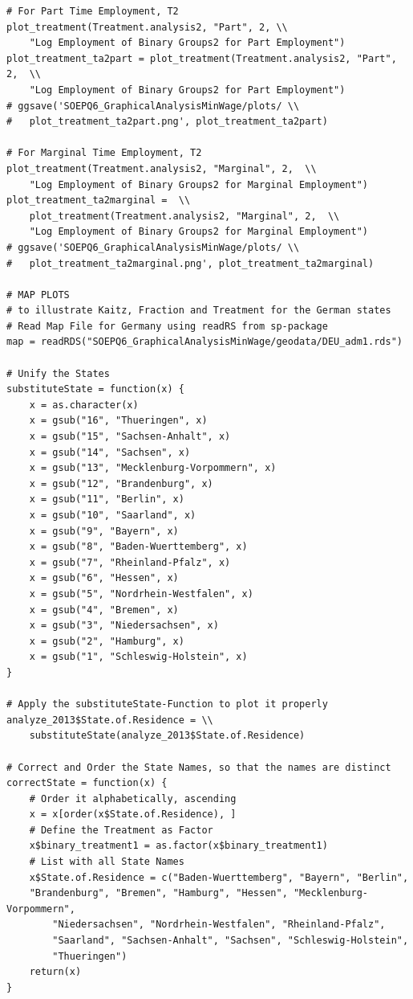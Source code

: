 \documentclass[a4paper]{article}
\begin{document}
{\begin{lstlisting}
# For Part Time Employment, T2
plot_treatment(Treatment.analysis2, "Part", 2, \\
	"Log Employment of Binary Groups2 for Part Employment")
plot_treatment_ta2part = plot_treatment(Treatment.analysis2, "Part", 2,  \\
	"Log Employment of Binary Groups2 for Part Employment")
# ggsave('SOEPQ6_GraphicalAnalysisMinWage/plots/ \\
#	plot_treatment_ta2part.png', plot_treatment_ta2part) 

# For Marginal Time Employment, T2
plot_treatment(Treatment.analysis2, "Marginal", 2,  \\
	"Log Employment of Binary Groups2 for Marginal Employment")
plot_treatment_ta2marginal =  \\
	plot_treatment(Treatment.analysis2, "Marginal", 2,  \\
	"Log Employment of Binary Groups2 for Marginal Employment")
# ggsave('SOEPQ6_GraphicalAnalysisMinWage/plots/ \\
#	plot_treatment_ta2marginal.png', plot_treatment_ta2marginal)

# MAP PLOTS 
# to illustrate Kaitz, Fraction and Treatment for the German states 
# Read Map File for Germany using readRS from sp-package
map = readRDS("SOEPQ6_GraphicalAnalysisMinWage/geodata/DEU_adm1.rds")

# Unify the States
substituteState = function(x) {
    x = as.character(x)
    x = gsub("16", "Thueringen", x)
    x = gsub("15", "Sachsen-Anhalt", x)
    x = gsub("14", "Sachsen", x)
    x = gsub("13", "Mecklenburg-Vorpommern", x)
    x = gsub("12", "Brandenburg", x)
    x = gsub("11", "Berlin", x)
    x = gsub("10", "Saarland", x)
    x = gsub("9", "Bayern", x)
    x = gsub("8", "Baden-Wuerttemberg", x)
    x = gsub("7", "Rheinland-Pfalz", x)
    x = gsub("6", "Hessen", x)
    x = gsub("5", "Nordrhein-Westfalen", x)
    x = gsub("4", "Bremen", x)
    x = gsub("3", "Niedersachsen", x)
    x = gsub("2", "Hamburg", x)
    x = gsub("1", "Schleswig-Holstein", x)
}

# Apply the substituteState-Function to plot it properly
analyze_2013$State.of.Residence = \\
	substituteState(analyze_2013$State.of.Residence)

# Correct and Order the State Names, so that the names are distinct
correctState = function(x) {
    # Order it alphabetically, ascending
    x = x[order(x$State.of.Residence), ]
    # Define the Treatment as Factor
    x$binary_treatment1 = as.factor(x$binary_treatment1)
    # List with all State Names
    x$State.of.Residence = c("Baden-Wuerttemberg", "Bayern", "Berlin", 
    "Brandenburg", "Bremen", "Hamburg", "Hessen", "Mecklenburg-Vorpommern", 
        "Niedersachsen", "Nordrhein-Westfalen", "Rheinland-Pfalz", 
        "Saarland", "Sachsen-Anhalt", "Sachsen", "Schleswig-Holstein", 
        "Thueringen")
    return(x)
}


\end{lstlisting}}
\end{document}
